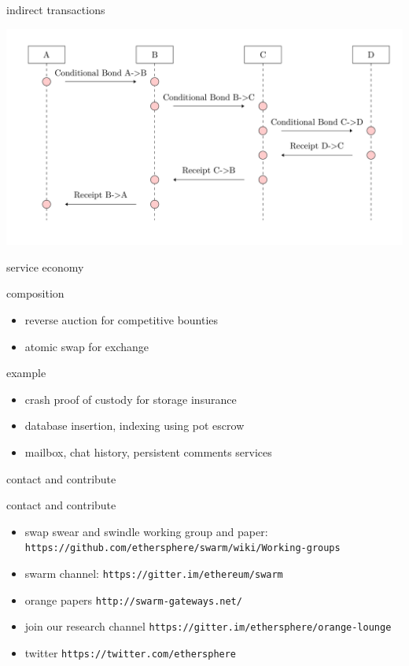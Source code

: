 \documentclass{beamer}
\begin{document}
\begin{frame}{indirect transactions}
\begin{block}{}
\includegraphics[width=\textwidth]{bond.png}
\end{block}
\end{frame}

\begin{frame}{service economy}
  \begin{block}{composition}
  \begin{itemize}
    \item reverse auction for competitive bounties
    \item atomic swap for exchange
  \end{itemize}
  \end{block}
  \begin{block}{example}
  \begin{itemize}
    \item crash proof of custody for storage insurance
    \item database insertion, indexing using pot escrow
    \item mailbox, chat history, persistent comments services
  \end{itemize}
  \end{block}
\end{frame}


\begin{frame}[plain]{contact and contribute}
\begin{block}{contact and contribute}
\begin{itemize}
\item swap swear and swindle working group and paper: \texttt{https://github.com/ethersphere/swarm/wiki/Working-groups}
\item swarm channel: \texttt{https://gitter.im/ethereum/swarm}
\item orange papers \texttt{http://swarm-gateways.net/}
\item join our research channel \texttt{https://gitter.im/ethersphere/orange-lounge}
\item twitter \texttt{https://twitter.com/ethersphere}
\end{itemize}
\end{block}

\end{frame}
\end{document}
